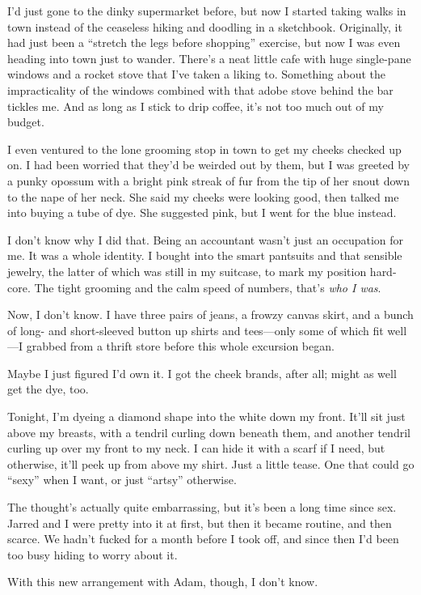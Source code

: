 I'd just gone to the dinky supermarket before, but now I started taking walks in town instead of the ceaseless hiking and doodling in a sketchbook. Originally, it had just been a ``stretch the legs before shopping'' exercise, but now I was even heading into town just to wander. There's a neat little cafe with huge single-pane windows and a rocket stove that I've taken a liking to. Something about the impracticality of the windows combined with that adobe stove behind the bar tickles me. And as long as I stick to drip coffee, it's not too much out of my budget.

I even ventured to the lone grooming stop in town to get my cheeks checked up on. I had been worried that they'd be weirded out by them, but I was greeted by a punky opossum with a bright pink streak of fur from the tip of her snout down to the nape of her neck. She said my cheeks were looking good, then talked me into buying a tube of dye. She suggested pink, but I went for the blue instead.

I don't know why I did that. Being an accountant wasn't just an occupation for me. It was a whole identity. I bought into the smart pantsuits and that sensible jewelry, the latter of which was still in my suitcase, to mark my position hard-core. The tight grooming and the calm speed of numbers, that's \emph{who I was}.

Now, I don't know. I have three pairs of jeans, a frowzy canvas skirt, and a bunch of long- and short-sleeved button up shirts and tees---only some of which fit well---I grabbed from a thrift store before this whole excursion began.

Maybe I just figured I'd own it. I got the cheek brands, after all; might as well get the dye, too.

Tonight, I'm dyeing a diamond shape into the white down my front. It'll sit just above my breasts, with a tendril curling down beneath them, and another tendril curling up over my front to my neck. I can hide it with a scarf if I need, but otherwise, it'll peek up from above my shirt. Just a little tease. One that could go ``sexy'' when I want, or just ``artsy'' otherwise.

The thought's actually quite embarrassing, but it's been a long time since sex. Jarred and I were pretty into it at first, but then it became routine, and then scarce. We hadn't fucked for a month before I took off, and since then I'd been too busy hiding to worry about it.

With this new arrangement with Adam, though, I don't know.

